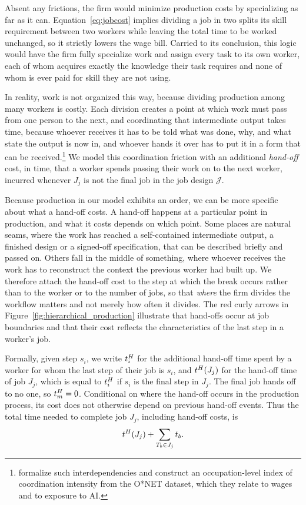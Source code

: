 Absent any frictions, the firm would minimize production costs by specializing as far as it can.
Equation~\eqref{eq:jobcost} implies dividing a job in two splits its skill requirement between two workers while leaving the total time to be worked unchanged, so it strictly lowers the wage bill.
Carried to its conclusion, this logic would have the firm fully specialize work and assign every task to its own worker, each of whom acquires exactly the knowledge their task requires and none of whom is ever paid for skill they are not using.

In reality, work is not organized this way, because dividing production among many workers is costly.
Each division creates a point at which work must pass from one person to the next, and coordinating that intermediate output takes time, because whoever receives it has to be told what was done, why, and what state the output is now in, and whoever hands it over has to put it in a form that can be received.\footnote{\cite{lee2023task} formalize such interdependencies and construct an occupation-level index of coordination intensity from the O*NET dataset, which they relate to wages and to exposure to AI.}
We model this coordination friction with an additional \emph{hand-off} cost, in time, that a worker spends passing their work on to the next worker, incurred whenever $J_j$ is not the final job in the job design $\mathcal{J}$.

Because production in our model exhibits an order, we can be more specific about what a hand-off costs.
A hand-off happens at a particular point in production, and what it costs depends on which point.
Some places are natural seams, where the work has reached a self-contained intermediate output, a finished design or a signed-off specification, that can be described briefly and passed on.
Others fall in the middle of something, where whoever receives the work has to reconstruct the context the previous worker had built up.
We therefore attach the hand-off cost to the step at which the break occurs rather than to the worker or to the number of jobs, so that \emph{where} the firm divides the workflow matters and not merely how often it divides.
The red curly arrows in Figure~\ref{fig:hierarchical_production} illustrate that hand-offs occur at job boundaries and that their cost reflects the characteristics of the last step in a worker's job.

Formally, given step $s_i$, we write $t^{H}_{i}$ for the additional hand-off time spent by a worker for whom the last step of their job is $s_i$, and $t^{H}_{}(J_j)$ for the hand-off time of job $J_j$, which is equal to $t^{H}_{i}$ if $s_i$ is the final step in $J_j$.
The final job hands off to no one, so $t^{H}_{m} = 0$.
Conditional on where the hand-off occurs in the production process, its cost does not otherwise depend on previous hand-off events.
Thus the total time needed to complete job $J_j$, including hand-off costs, is
\[
t^{H}_{}(J_j) + \sum_{T_b \in J_j} t_{b}.
\]

